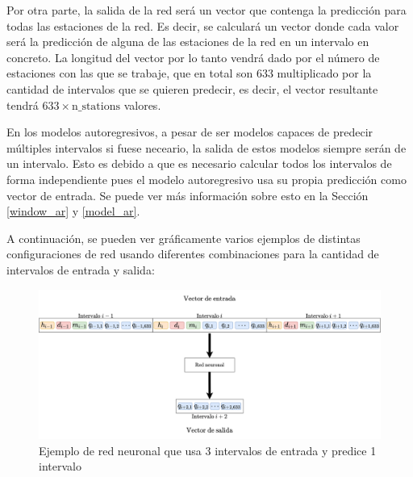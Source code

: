 Por otra parte, la salida de la red será un vector que contenga la predicción para todas las estaciones de la red. Es decir, se calculará un vector donde cada valor será la predicción de alguna de las estaciones de la red en un intervalo en concreto. La longitud del vector por lo tanto vendrá dado por el número de estaciones con las que se trabaje, que en total son $633$ multiplicado por la cantidad de intervalos que se quieren predecir, es decir, el vector resultante tendrá $633 \times \text{n\_stations}$ valores. 
\newline

En los modelos autoregresivos, a pesar de ser modelos capaces de predecir múltiples intervalos si fuese neceario, la salida de estos modelos siempre serán de un intervalo. Esto es debido a que es necesario calcular todos los intervalos de forma independiente pues el modelo autoregresivo usa su propia predicción como vector de entrada. Se puede ver más información sobre esto en la Sección \ref{window_ar} y \ref{model_ar}.
\newline

A continuación, se pueden ver gráficamente varios ejemplos de distintas configuraciones de red usando diferentes combinaciones para la cantidad de intervalos de entrada y salida:


\begin{figure}[H]
    \centering
    \includegraphics[width=14cm]{images/solution/preprocessing/models-design-1.png}
    \caption{Ejemplo de red neuronal que usa 3 intervalos de entrada y predice 1 intervalo}
    \label{fig:models-design-1}
\end{figure}


